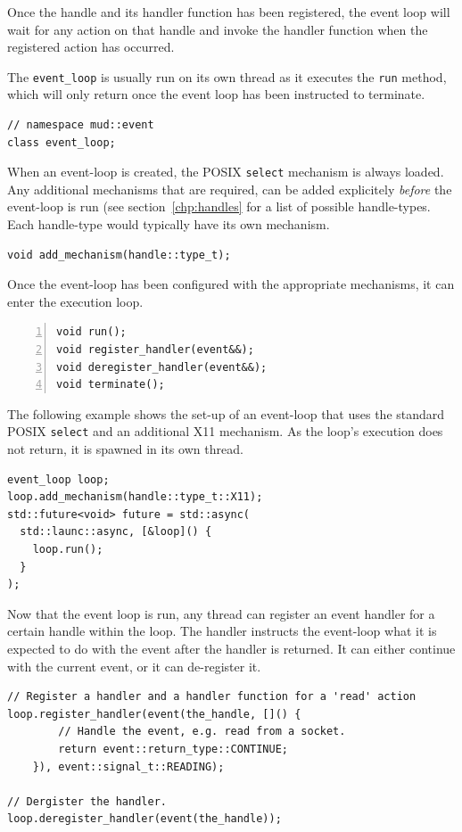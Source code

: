 \documentclass[10pt,a4paper,openany]{mudbook}
\makeatletter
\newcommand{\indextt}[2][]{\texttt{#2}\index{#2@\texttt{#2}#1}}
\makeatother
\begin{document}
Once the handle and its handler function has been registered, the event loop
will wait for any action on that handle and invoke the handler function when
the registered action has occurred.

The \indextt{event\_loop} is usually run on its own thread as it executes the
\indextt{run} method, which will only return once the event loop has been
instructed to terminate.

\begin{lstlisting}[style=definition]
// namespace mud::event
class event_loop;
\end{lstlisting}

When an event-loop is created, the POSIX \texttt{select} mechanism is always
loaded. Any additional mechanisms that are required, can be added explicitely
\textit{before} the event-loop is run (see section~\ref{chp:handles} for a
list of possible handle-types. Each handle-type would typically have its own
mechanism.

\begin{lstlisting}[style=definition]
void add_mechanism(handle::type_t);
\end{lstlisting}

Once the event-loop has been configured with the appropriate mechanisms, it
can enter the execution loop.

\begin{lstlisting}[style=definition,numbers=left]
void run();
void register_handler(event&&);
void deregister_handler(event&&);
void terminate();
\end{lstlisting}

The following example shows the set-up of an event-loop that uses the standard
POSIX \texttt{select} and an additional X11 mechanism. As the loop's execution
does not return, it is spawned in its own thread.

\begin{lstlisting}[style=snippet]
event_loop loop;
loop.add_mechanism(handle::type_t::X11);
std::future<void> future = std::async(
  std::launc::async, [&loop]() {
    loop.run();
  }
);
\end{lstlisting}

Now that the event loop is run, any thread can register an event handler for a
certain handle within the loop. The handler instructs the event-loop what it
is expected to do with the event after the handler is returned. It can either
continue with the current event, or it can de-register it.

\begin{lstlisting}[style=snippet]
// Register a handler and a handler function for a 'read' action
loop.register_handler(event(the_handle, []() {
        // Handle the event, e.g. read from a socket.
        return event::return_type::CONTINUE;
    }), event::signal_t::READING);

// Dergister the handler.
loop.deregister_handler(event(the_handle));
\end{lstlisting}
\end{document}
